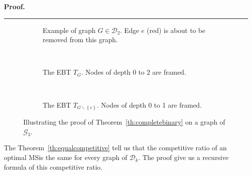 \documentclass[preprint]{elsarticle}
\newenvironment{proof}[1][Proof]{\textbf{#1.} }{\ \rule{0.5em}{0.5em}}
\newcommand{\set}[1]{\left\{ #1 \right\}}
\newcommand{\card}[1]{\left| #1 \right|}
\newcommand{\mcalg}{\mathcal{G}}
\newcommand{\mcald}{\mathcal{D}}
\newcommand{\mts}{MS}
\begin{document}
\begin{proof}
\end{proof}

\begin{figure}[h]
\centering
\begin{subfigure}[b]{0.3\columnwidth}
\centering
\scalebox{.40}{}
\caption{Example of graph $G \in \mcald_2$. Edge $e$ (red) is about to be removed from this graph.}
\label{subfig:proofth1_a}
\end{subfigure}
~
\begin{subfigure}[b]{0.3\columnwidth}
\centering
\scalebox{.55}{}
\caption{The EBT $T_{G}$. Nodes of depth 0 to 2 are framed.}
\label{subfig:proofth1_b}
\end{subfigure}
~
\begin{subfigure}[b]{0.3\columnwidth}
\centering
\scalebox{.55}{}
\caption{The EBT $T_{G \backslash \set{e}}$. Nodes of depth 0 to 1 are framed.}
\label{subfig:proofth1_c}
\end{subfigure}
\caption{Illustrating the proof of Theorem~\ref{th:completebinary} on a graph of $\mcalg_3$.}
\label{fig:proofth1}
\end{figure}


The Theorem~\ref{th:equalcompetitive} tell us that the competitive ratio of an optimal \mts is the same for every graph of $\mcald_k$. The proof give us a recursive formula of this competitive ratio.
\end{document}
